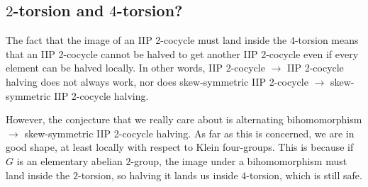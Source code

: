 \documentclass[10pt]{amsart}
\begin{document}
\subsection{$2$-torsion and $4$-torsion?}

The fact that the image of an IIP 2-cocycle must land inside the
$4$-torsion means that an IIP 2-cocycle cannot be halved to get
another IIP 2-cocycle even if every element can be halved locally. In
other words, IIP 2-cocycle $\to$ IIP 2-cocycle halving does not always
work, nor does skew-symmetric IIP 2-cocycle $\to$ skew-symmetric IIP
2-cocycle halving.

However, the conjecture that we really care about is alternating
bihomomorphism $\to$ skew-symmetric IIP 2-cocycle halving. As far as
this is concerned, we are in good shape, at least locally with respect
to Klein four-groups. This is because if $G$ is an elementary abelian
$2$-group, the image under a bihomomorphism must land inside the
$2$-torsion, so halving it lands us inside $4$-torsion, which is still
safe.
\end{document}
